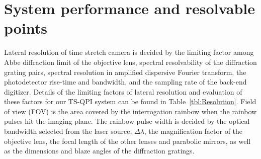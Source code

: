 \documentclass[aps,pra,reprint,longbibliography,groupedaddress]{revtex4-1}
\begin{document}
\section{System performance and resolvable points}

Lateral resolution of time stretch camera is decided by the limiting factor among Abbe diffraction limit of the objective lens, spectral resolvability of the diffraction grating pairs, spectral resolution in amplified dispersive Fourier transform, the photodetector rise-time and bandwidth, and the sampling rate of the back-end digitizer. Details of the limiting factors of lateral resolution and evaluation of these factors for our TS-QPI system can be found in Table~\ref{tbl:Resolution}. Field of view (FOV) is the area covered by the interrogation rainbow when the rainbow pulses hit the imaging plane. The rainbow pulse width is decided by the optical bandwidth selected from the laser source, $\Delta\lambda$, the magnification factor of the objective lens, the focal length of the other lenses and parabolic mirrors, as well as the dimensions and blaze angles of the diffraction gratings.
\end{document}
